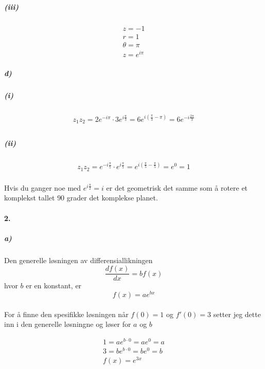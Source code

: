 \documentclass[11pt, A4paper,norsk]{article}
\begin{document}
				\subparagraph{(iii)}
					\begin{gather}
z = -1 \\
r = 1 \\
\theta = \pi \\
z = e^{i\pi}
					\end{gather}










			\subparagraph{d)}
				\subparagraph{(i)}
					\begin{gather}
z_{1}z_{2} = 2e^{-i\pi} \cdot 3e^{i\frac{\pi}{3}} = 6e^{i\left( \frac{\pi}{3} - \pi \right)} = 6e^{-i\frac{2\pi}{3}} \\
					\end{gather}









				\subparagraph{(ii)}
					\begin{gather}
z_{1}z_{2} = e^{-i\frac{\pi}{5}} \cdot e^{i\frac{\pi}{5}} = e^{i\left( \frac{\pi}{5} - \frac{\pi}{5} \right)} = e^{0} = 1 \\
					\end{gather}
				\begin{flushleft}
Hvis du ganger noe med $e^{i\frac{\pi}{2}} = i$ er det geometrisk det samme som å rotere et komplekst tallet $90$ grader det komplekse planet.
				\end{flushleft}










		\paragraph{2.}
			\subparagraph{a)}
				\begin{flushleft}
Den generelle løsningen av differensiallikningen $$\frac{df(x)}{dx}	= bf(x)$$ hvor $b$ er en konstant, er $$f(x) = ae^{bx}$$ \\
For å finne den spesifikke løsningen når $f(0) = 1$ og $f'(0) = 3$ setter jeg dette inn i den generelle løsningne og løser for $a$ og $b$
				\end{flushleft}
				\begin{gather}
1 = ae^{b \cdot 0} = ae^{0} = a \\
3 = be^{b \cdot 0} = be^{0} = b \\
f(x) = e^{3x}
				\end{gather}
\end{document}
